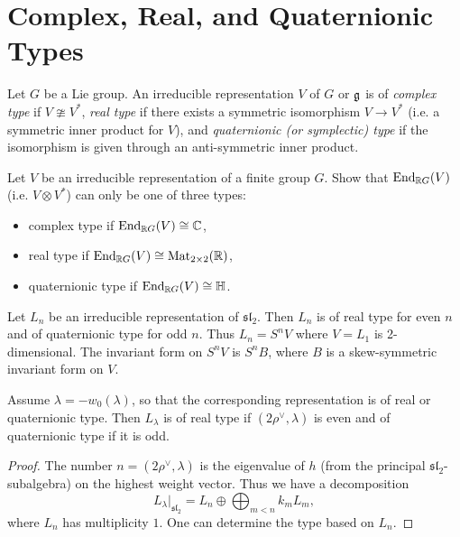 \section{Complex, Real, and Quaternionic Types}

\begin{definition}
  Let $G$ be a Lie group. An
  irreducible representation $V$ of
  $G$ or $\mathfrak{g}$ is of
  \emph{complex type} if
  $V \ncong V^*$, \emph{real type}
  if there exists a symmetric
  isomorphism $V \to V^*$ (i.e. a
  symmetric inner product for $V$), and
  \emph{quaternionic (or symplectic) type}
    if the isomorphism is
    given through an anti-symmetric
    inner product.
\end{definition}

\begin{exercise}
  Let $V$ be an irreducible
  representation of a finite group $G$.
  Show that $\operatorname{End}_{\mathbb{R} G}(V)$
  (i.e. $V \otimes V^*$)
  can only be one of three types:
  \begin{itemize}
    \item complex type if
      $\operatorname{End}_{\mathbb{R} G}(V) \cong \mathbb{C}$,
    \item real type if
      $\operatorname{End}_{\mathbb{R} G}(V) \cong \operatorname{Mat}_{2 \times 2}(\mathbb{R})$,
    \item quaternionic type if
      $\operatorname{End}_{\mathbb{R} G}(V) \cong \mathbb{H}$.
  \end{itemize}
\end{exercise}

\begin{example}
  Let $L_n$ be an irreducible
  representation of
  $\mathfrak{sl}_2$. Then $L_n$
  is of real type for even $n$ and
  of quaternionic type for odd $n$.
  Thus $L_n = S^n V$ where
  $V = L_1$ is 2-dimensional.
  The invariant form on $S^n V$
  is $S^n B$, where
  $B$ is a skew-symmetric invariant
  form on $V$.
\end{example}

\begin{prop}
  Assume $\lambda = -w_0(\lambda)$,
  so that the corresponding
  representation is of real or
  quaternionic type. Then $L_\lambda$
  is of real type if
  $(2\rho^\vee, \lambda)$ is even
  and of quaternionic type if
  it is odd.
\end{prop}

\begin{proof}
  The number
  $n = (2\rho^\vee, \lambda)$
  is the eigenvalue of $h$ (from the
  principal $\mathfrak{sl}_2$-subalgebra)
  on the highest weight vector.
  Thus we have a decomposition
  \[
    L_\lambda|_{\mathfrak{sl}_2}
    = L_n \oplus \bigoplus_{m < n} k_m L_m,
  \]
  where $L_n$ has multiplicity $1$.
  One can determine the type based
  on $L_n$.
\end{proof}

